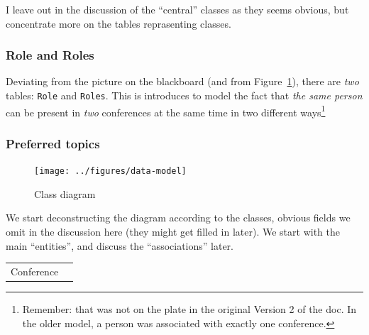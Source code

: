 


I leave out in the discussion of the ``central'' classes as they seems
obvious, but concentrate more on the tables reprasenting classes.



\subsubsection*{Role and Roles}
\label{sec:roleandroles}%

Deviating from the picture on the blackboard (and from
Figure~\ref{fig:classdiagram}), there are \emph{two} tables: \texttt{Role}
and \texttt{Roles}. This is introduces to model the fact that \emph{the
  same person} can be present in \emph{two} conferences at the same time in
two different ways\footnote{Remember: that was not on the plate in the
  original Version 2 of the doc. In the older model, a person was
  associated with exactly one conference.}


\subsubsection{Preferred topics}
\label{sec:preferredtopic}











\newpage


\begin{figure}[htbp]
  \centering
  \texttt{[image: ../figures/data-model]}
  \caption{Class diagram}
  \label{fig:classdiagram}
\end{figure}

We start deconstructing the diagram according to the classes, obvious
fields we omit in the discussion here (they might get filled in later). We
start with the main ``entities'', and discuss the ``associations'' later.


\begin{table}[htbp]
  \centering
  \begin{tabular}[t]{ll}
    Conference &
  \end{tabular}
  
\end{table}
















%

\newpage










%


%

